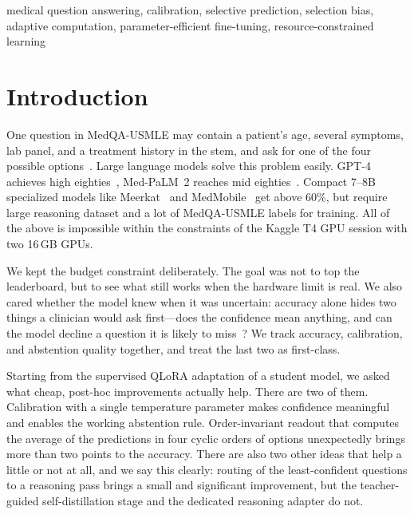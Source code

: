 \documentclass[conference]{IEEEtran}
\begin{document}
\begin{IEEEkeywords}
medical question answering, calibration, selective prediction, selection bias, adaptive computation, parameter-efficient fine-tuning, resource-constrained learning
\end{IEEEkeywords}

\section{Introduction}
One question in MedQA-USMLE may contain a patient's age, several symptoms, lab panel, and a treatment history in the stem, and ask for one of the four possible options~\cite{medqa}. Large language models solve this problem easily. GPT-4 achieves high eighties~\cite{gpt4med}, Med-PaLM~2 reaches mid eighties~\cite{medpalm}. Compact 7--8B specialized models like Meerkat~\cite{meerkat} and MedMobile~\cite{medmobile} get above 60\%, but require large reasoning dataset and a lot of MedQA-USMLE labels for training. All of the above is impossible within the constraints of the Kaggle T4 GPU session with two 16\,GB GPUs.

We kept the budget constraint deliberately. The goal was not to top the leaderboard, but to see what still works when the hardware limit is real. We also cared whether the model knew when it was uncertain: accuracy alone hides two things a clinician would ask first---does the confidence mean anything, and can the model decline a question it is likely to miss~\cite{trustsurvey}? We track accuracy, calibration, and abstention quality together, and treat the last two as first-class.

Starting from the supervised QLoRA adaptation of a student model, we asked what cheap, post-hoc improvements actually help. There are two of them. Calibration with a single temperature parameter makes confidence meaningful and enables the working abstention rule. Order-invariant readout that computes the average of the predictions in four cyclic orders of options unexpectedly brings more than two points to the accuracy. There are also two other ideas that help a little or not at all, and we say this clearly: routing of the least-confident questions to a reasoning pass brings a small and significant improvement, but the teacher-guided self-distillation stage and the dedicated reasoning adapter do not.
\end{document}

